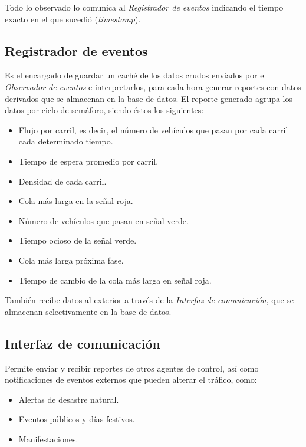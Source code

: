 Todo lo observado lo comunica al \emph{Registrador de eventos} indicando
el tiempo exacto en el que sucedió (\emph{timestamp}).

\hypertarget{registrador-de-eventos}{%
\subsection{Registrador de eventos}\label{registrador-de-eventos}}

Es el encargado de guardar un caché de los datos crudos enviados por el
\emph{Observador de eventos} e interpretarlos, para cada hora generar
reportes con datos derivados que se almacenan en la base de datos. El
reporte generado agrupa los datos por ciclo de semáforo, siendo éstos
los siguientes:

\begin{itemize}
\tightlist
\item
  Flujo por carril, es decir, el número de vehículos que pasan por cada
  carril cada determinado tiempo.
\item
  Tiempo de espera promedio por carril.
\item
  Densidad de cada carril.
\item
  Cola más larga en la señal roja.
\item
  Número de vehículos que pasan en señal verde.
\item
  Tiempo ocioso de la señal verde.
\item
  Cola más larga próxima fase.
\item
  Tiempo de cambio de la cola más larga en señal roja.
\end{itemize}

También recibe datos al exterior a través de la \emph{Interfaz de
comunicación}, que se almacenan selectivamente en la base de datos.

\hypertarget{interfaz-de-comunicaciuxf3n}{%
\subsection{Interfaz de
comunicación}\label{interfaz-de-comunicaciuxf3n}}

Permite enviar y recibir reportes de otros agentes de control, así como
notificaciones de eventos externos que pueden alterar el tráfico, como:

\begin{itemize}
\tightlist
\item
  Alertas de desastre natural.
\item
  Eventos públicos y días festivos.
\item
  Manifestaciones.
\end{itemize}

